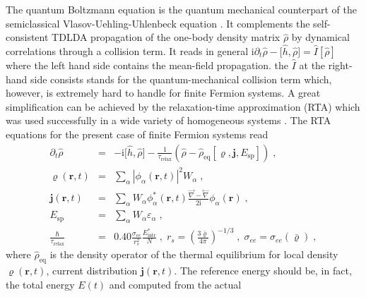 \documentclass[final,1p]{elsarticle}
\begin{document}
The quantum Boltzmann equation is the quantum mechanical
counterpart of the
semiclassical Vlasov-Uehling-Uhlenbeck equation \cite{Ber88,Abe96}.
It complements the self-consistent TDLDA propagation 
of the one-body density matrix $\hat{\rho}$ by
dynamical correlations through a collision term. It reads in
general \cite{Rei85f,Goe86a}
$\mathrm{i}\partial_t\hat{\rho}
  -
  \big[\hat{h},\hat{\rho}\big]
  =
  \hat{I}[\hat{\rho}]
$
where the left hand side contains the mean-field propagation. the
$\hat{I}$ at the right-hand side consists stands for the
quantum-mechanical collision term which, however, is extremely hard to
handle for finite Fermion systems. A great simplification can be
achieved by the relaxation-time approximation (RTA) which was used
successfully in a wide variety of homogeneous systems
\cite{Pin66,Ash76}. The RTA equations for the present case of finite
Fermion systems read \cite{Rei15a}
\begin{subequations}
\label{eq:EoMbasic}
\begin{eqnarray}
  \partial_t\hat{\rho}
  &=&
  -\mathrm{i}\big[\hat{h},\hat{\rho}\big]
  -
  \frac{1}{\tau_\mathrm{relax}}
  \left(\hat{\rho}-\hat{\rho}_\mathrm{eq}[\varrho,\mathbf{j},E_\mathrm{sp}]\right)
  \;,
\label{eq:EoMbasicrho}
\\
  \varrho(\mathbf{r},t)
  &=&
  \sum_\alpha \left|\phi_\alpha(\mathbf{r},t)\right|^2 W_\alpha
  \;,
\label{eq:locdens}\\
  \mathbf{j}(\mathbf{r},t)
  &=&
  \sum_\alpha W_\alpha\phi_\alpha^*(\mathbf{r},t)
     \frac{\stackrel{\rightarrow}{\nabla}-\stackrel{\leftarrow}{\nabla}}
          {2\mathrm{i}}
     \phi_\alpha(\mathbf{r})
  \;,
\label{eq:current}\\
  E_\mathrm{sp}
  &=&
  \sum_\alpha W_\alpha\varepsilon_\alpha
  \;,
\\  
  \frac{\hbar}{\tau_\mathrm{relax}}
  &=&
  {0.40}\frac{\sigma_{ee}}{r_s^2}\frac{{E}^*_\mathrm{intr}}{N}
  \;,\;
  r_s=\left(\frac{3\bar{\varrho}}{4\pi}\right)^{-1/3}
  \;,\;
  \sigma_{ee}=\sigma_{ee}(\bar{\varrho})
  \;,
\label{eq:relaxtime}
\end{eqnarray}
\end{subequations}
where $\hat{\rho}_\mathrm{eq}$ is the density operator of the thermal
equilibrium for local density $\varrho(\mathbf{r},t)$, current
distribution $\mathbf{j}(\mathbf{r},t)$. The reference energy should
be, in fact, the total energy $E(t)$ and computed from the actual
\end{document}
